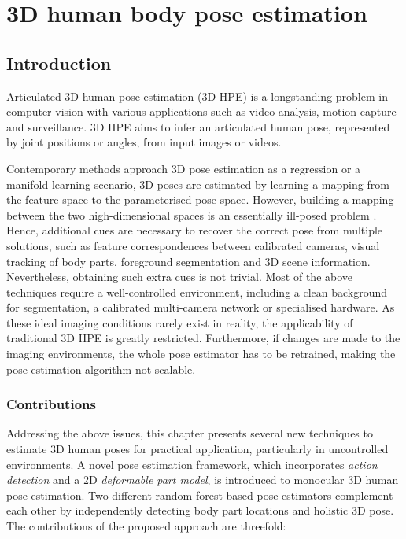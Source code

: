 \chapter{3D human body pose estimation}
\label{chap/body}

\section{Introduction}
\label{sec/body/intro}

Articulated 3D human pose estimation (3D HPE) is a longstanding problem in computer vision with various applications such as video analysis, motion capture and surveillance.
3D HPE aims to infer an articulated human pose, represented by joint positions or angles, from input images or videos. 

Contemporary methods approach 3D pose estimation as a regression or a manifold learning scenario, 3D poses are estimated by learning a mapping from the feature space to the parameterised pose space. However, building a mapping between the two high-dimensional spaces is an essentially ill-posed problem \cite{Elgammal2004}. Hence, additional cues are necessary to recover the correct pose from multiple solutions, such as feature correspondences between calibrated cameras, visual tracking of body parts, foreground segmentation and 3D scene information. 
Nevertheless, obtaining such extra cues is not trivial. 
Most of the above techniques require a well-controlled environment, including a clean background for segmentation, a calibrated multi-camera network or specialised hardware.   
As these ideal imaging conditions rarely exist in reality, the applicability of traditional 3D HPE is greatly restricted. 
Furthermore, if changes are made to the imaging environments, the whole pose estimator has to be retrained, making the pose estimation algorithm not scalable. 



\subsection{Contributions}

Addressing the above issues, this chapter presents several new techniques to estimate 3D human poses for practical application, particularly in uncontrolled environments. 
A novel pose estimation framework, which incorporates \emph{action detection} and a 2D \emph{deformable part model}, is introduced to monocular 3D human pose estimation. 
Two different random forest-based pose estimators complement each other by independently detecting body part locations and holistic 3D pose. The contributions of the proposed approach are threefold:  

